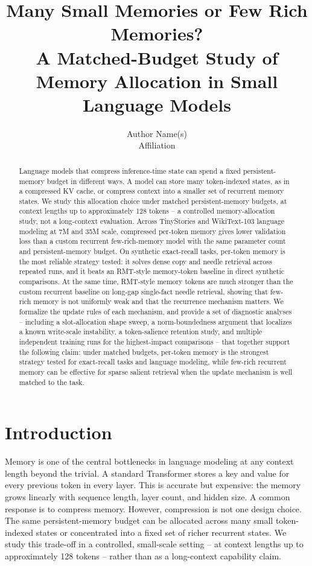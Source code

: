 \documentclass[10pt]{article} %
\title{\bf Many Small Memories or Few Rich Memories?\\
\large A Matched-Budget Study of Memory Allocation in Small Language Models}
\author{Author Name(s) \\ Affiliation}
\date{}
\begin{document}
\maketitle

\begin{abstract}
Language models that compress inference-time state can spend a fixed
persistent-memory budget in different ways. A model can store many
token-indexed states, as in a compressed KV cache, or compress context into
a smaller set of recurrent memory states. We study this allocation choice
under matched persistent-memory budgets, at context lengths up to
approximately 128 tokens -- a controlled memory-allocation study, not a
long-context evaluation. Across TinyStories and WikiText-103 language
modeling at 7M and 35M scale, compressed per-token memory gives lower
validation loss than a custom recurrent few-rich-memory model with the same
parameter count and persistent-memory budget. On synthetic exact-recall
tasks, per-token memory is the most reliable strategy tested: it solves
dense copy and needle retrieval across repeated runs, and it beats an RMT-style
memory-token baseline in direct synthetic comparisons. At the same time,
RMT-style memory tokens are much stronger than the custom recurrent
baseline on long-gap single-fact needle retrieval, showing that few-rich
memory is not uniformly weak and that the recurrence mechanism matters. We
formalize the update rules of each mechanism, and provide a set of
diagnostic analyses -- including a slot-allocation shape sweep, a
norm-boundedness argument that localizes a known write-scale instability,
a token-salience retention study, and multiple independent training runs
for the highest-impact comparisons -- that together support the following
claim: under matched budgets, per-token memory is the strongest strategy
tested for exact-recall tasks and language modeling, while few-rich
recurrent memory can be effective for sparse salient retrieval when the
update mechanism is well matched to the task.
\end{abstract}

\section{Introduction}

Memory is one of the central bottlenecks in language modeling at any
context length beyond the trivial. A standard Transformer stores a key and
value for every previous token in every layer. This is accurate but
expensive: the memory grows linearly with sequence length, layer count,
and hidden size. A common response is to compress memory. However,
compression is not one design choice. The same persistent-memory budget
can be allocated across many small token-indexed states or concentrated
into a fixed set of richer recurrent states. We study this trade-off in a
controlled, small-scale setting -- at context lengths up to approximately
128 tokens -- rather than as a long-context capability claim.
\end{document}
